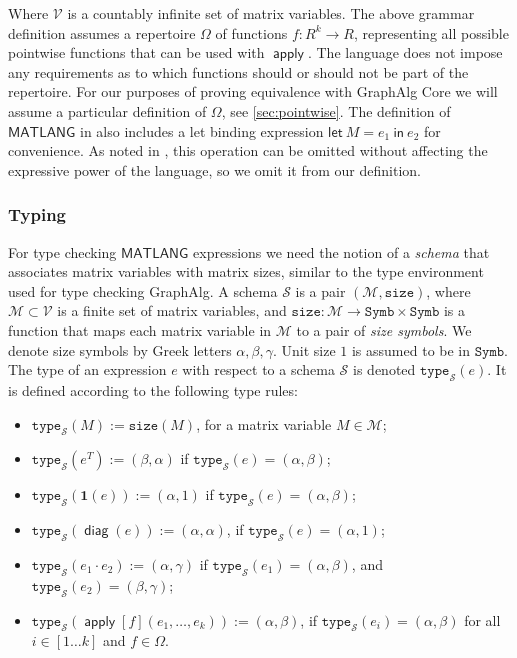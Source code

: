 \documentclass{article}
\newcommand\graphalg{\textsf{GraphAlg}}
\newcommand{\ML}{\mathsf{MATLANG}}
\newcommand{\transp}[1]{#1^T}
\newcommand{\SyntaxStyle}{\mathsf}
\newcommand{\LetIn}[3]{\SyntaxStyle{let}\ #1=#2\ \SyntaxStyle{in}\ #3}
\newcommand{\rowdom}{\mathbf{1}}
\DeclareMathOperator{\diag}{\mathsf{diag}}
\DeclareMathOperator{\Apply}{\mathsf{apply}}
\newcommand{\M}{M}
\newcommand{\Mvar}{\mathcal{V}}
\newcommand{\Sch}{\mathcal{S}}
\newcommand{\ttypes}{\texttt{type}_{\Sch}}
\newcommand{\Mnam}{\mathcal{M}}
\newcommand{\DD}{\texttt{Symb}}
\newcommand{\size}{\texttt{size}}
\begin{document}
Where $\Mvar$ is a countably infinite set of matrix variables.
The above grammar definition assumes a repertoire $\Omega$ of functions $f : R^k \to R$, representing all possible pointwise functions that can be used with $\Apply$.
The language does not impose any requirements as to which functions should or should not be part of the repertoire.
For our purposes of proving equivalence with \graphalg{} Core we will assume a particular definition of $\Omega$, see \cref{sec:pointwise}.
The definition of $\ML$ in \cite{brijder_expressive_2019} also includes a let binding expression $\LetIn{\M}{e_1}{e_2}$ for convenience.
As noted in \cite{brijder_expressive_2019}, this operation can be omitted without affecting the expressive power of the language, so we omit it from our definition.

\subsubsection*{Typing}
For type checking $\ML$ expressions we need the notion of a \emph{schema} that associates matrix variables with matrix sizes,
similar to the type environment used for type checking \graphalg{}.
A schema $\Sch$ is a pair $(\Mnam,\size)$, where $\Mnam\subset \Mvar$ is a finite set of matrix variables,
and $\size: \Mnam \to \DD\times \DD$ is a function that maps each matrix variable in $\Mnam$ to a pair of \textit{size symbols}.
We denote size symbols by Greek letters $\alpha,\beta,\gamma$.
Unit size $1$ is assumed to be in $\DD$.
The type of an expression $e$ with respect to a schema $\Sch$ is denoted $\ttypes(e)$.
It is defined according to the following type rules:

\begin{itemize}
    \item $\ttypes(M):= \size(M)$, for a matrix variable $M\in\Mnam$;
    \item $\ttypes(\transp{e}):= (\beta,\alpha)$ if $\ttypes(e)=(\alpha,\beta)$;
    \item $\ttypes(\rowdom(e)):= (\alpha,1)$ if $\ttypes(e)=(\alpha,\beta)$;
    \item $\ttypes(\diag(e)):= (\alpha,\alpha)$, if $\ttypes(e)=(\alpha,1)$;
    \item $\ttypes(e_1 \cdot e_2):= (\alpha,\gamma)$ if  $\ttypes(e_1)=(\alpha,\beta)$, and $\ttypes(e_2)=(\beta,\gamma)$;
    \item $\ttypes(\Apply[f](e_1,\ldots ,e_k)):= (\alpha,\beta)$, if $\ttypes(e_i) = (\alpha, \beta)$ for all $i \in [1 \ldots k]$ and $f \in \Omega$.
\end{itemize}
\end{document}
